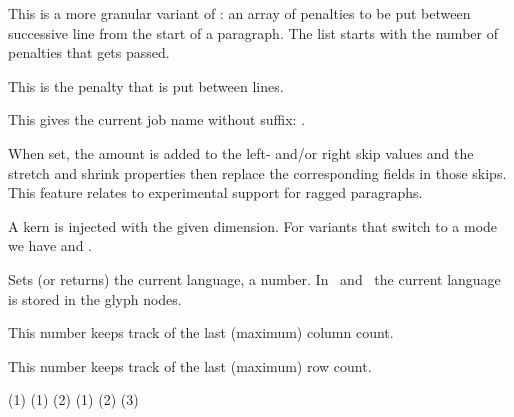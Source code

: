 \stopoldprimitive

\startoldprimitive[title={\prm {interlinepenalties}}]

This is a more granular variant of : an array of penalties
to be put between successive line from the start of a paragraph. The list starts
with the number of penalties that gets passed.

\stopoldprimitive

\startoldprimitive[title={\prm {interlinepenalty}}]

This is the penalty that is put between lines.

\stopoldprimitive

\startoldprimitive[title={\prm {jobname}}]

This gives the current job name without suffix: {\tttf \jobname}.

\stopoldprimitive

\startnewprimitive[title={\prm {justificationskip}}]

When set, the amount is added to the left- and/or right skip values and the
stretch and shrink properties then replace the corresponding fields in those
skips. This feature relates to experimental support for ragged paragraphs.

\stopnewprimitive

\startoldprimitive[title={\prm {kern}}]

A kern is injected with the given dimension. For variants that switch to a mode
we have  and .

\stopoldprimitive

\startoldprimitive[title={\prm {language}}]

Sets (or returns) the current language, a number. In \LUATEX\ and \LUAMETATEX\
the current language is stored in the glyph nodes.

\stopoldprimitive

\startnewprimitive[title={\prm {lastalignmentcolumn}}]

This number keeps track of the last (maximum) column count.

\stopnewprimitive

\startnewprimitive[title={\prm {lastalignmentrow}}]

This number keeps track of the last (maximum) row count.

\stopnewprimitive

\startnewprimitive[title={\prm {lastarguments}}]

\startbuffer
\def\MyMacro    #1{\the\lastarguments (#1) }          \MyMacro{1}       \crlf
\def\MyMacro  #1#2{\the\lastarguments (#1) (#2)}      \MyMacro{1}{2}    \crlf
\def\MyMacro#1#2#3{\the\lastarguments (#1) (#2) (#3)} \MyMacro{1}{2}{3} \par

